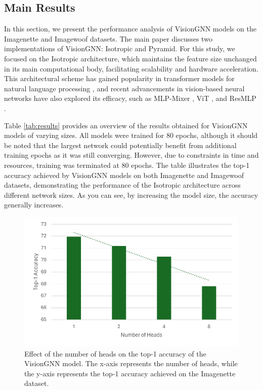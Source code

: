 \documentclass[sigconf, nonacm]{acmart}
\begin{document}
\subsection{Main Results}

In this section, we present the performance analysis of VisionGNN models on the Imagenette and Imagewoof datasets. The main paper discusses two implementations of VisionGNN: Isotropic and Pyramid. For this study, we focused on the Isotropic architecture, which maintains the feature size unchanged in its main computational body, facilitating scalability and hardware acceleration. This architectural scheme has gained popularity in transformer models for natural language processing \cite{attentionisallyouneed}, and recent advancements in vision-based neural networks have also explored its efficacy, such as MLP-Mixer \cite{mlpmixer}, ViT \cite{ViT}, and ResMLP \cite{resmlp}.

Table \ref{tab:results} provides an overview of the results obtained for VisionGNN models of varying sizes. All models were trained for 80 epochs, although it should be noted that the largest network could potentially benefit from additional training epochs as it was still converging. However, due to constraints in time and resources, training was terminated at 80 epochs. The table illustrates the top-1 accuracy achieved by VisionGNN models on both Imagenette and Imagewoof datasets, demonstrating the performance of the Isotropic architecture across different network sizes. As you can see, by increasing the model size, the accuracy generally increases.

\begin{figure}[b]
  \centering
  \includegraphics[width=\linewidth]{figures/num_head_chart.pdf}
  \caption{Effect of the number of heads on the top-1 accuracy of the VisionGNN model. The x-axis represents the number of heads, while the y-axis represents the top-1 accuracy achieved on the Imagenette dataset.}
  \label{fig:num_head_chart}
\end{figure}
\end{document}
